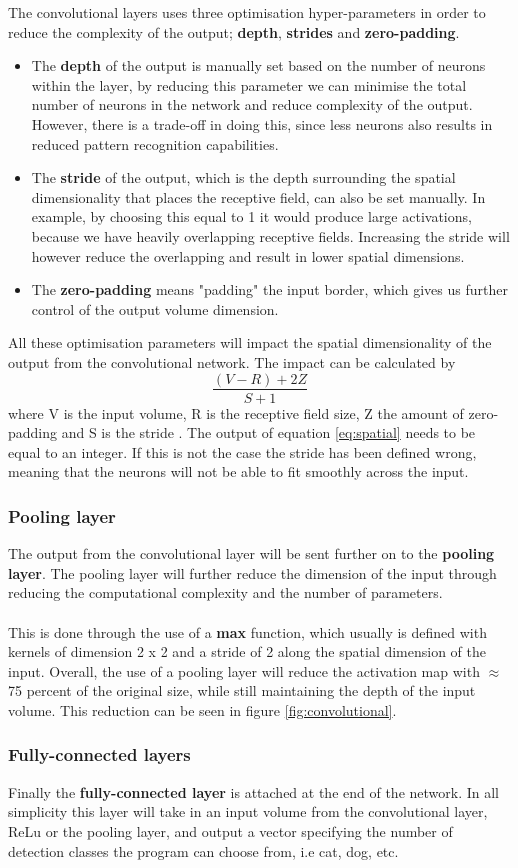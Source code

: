 The convolutional layers uses three optimisation hyper-parameters in order to reduce the complexity of the output; \textbf{depth}, \textbf{strides} and \textbf{zero-padding}.
\begin{itemize}
    \item The \textbf{depth} of the output is manually set based on the number of neurons within the layer, by reducing this parameter we can minimise the total number of neurons in the network and reduce complexity of the output. However, there is a trade-off in doing this, since less neurons also results in reduced pattern recognition capabilities.
    \item The \textbf{stride} of the output, which is the depth surrounding the spatial dimensionality that places the receptive field, can also be set manually. In example, by choosing this equal to 1 it would produce large activations, because we have heavily overlapping receptive fields. Increasing the stride will however reduce the overlapping and result in lower spatial dimensions.
    \item The \textbf{zero-padding} means "padding" the input border, which gives us further control of the output volume dimension.
\end{itemize}
All these optimisation parameters will impact the spatial dimensionality of the output from the convolutional network. The impact can be calculated by
\begin{equation}
    \frac{(V-R)+2Z}{S+1}
\label{eq:spatial}
\end{equation}
where V is the input volume, R is the receptive field size, Z the amount of zero-padding and S is the stride \cite{Keiron}. The output of equation \ref{eq:spatial} needs to be equal to an integer. If this is not the case the stride has been defined wrong, meaning that the neurons will not be able to fit smoothly across the input. 
\subsubsection{Pooling layer}
The output from the convolutional layer will be sent further on to the \textbf{pooling layer}. The pooling layer will further reduce the dimension of the input through reducing the computational complexity and the number of parameters.\\\\
This is done through the use of a \textbf{max} function, which usually is defined with kernels of dimension 2 x 2 and a stride of 2 along the spatial dimension of the input. Overall, the use of a pooling layer will reduce the activation map with $\approx$ 75 percent of the original size, while still maintaining the depth of the input volume. This reduction can be seen in figure \ref{fig:convolutional}. 
\subsubsection{Fully-connected layers}
Finally the \textbf{fully-connected layer} is attached at the end of the network. In all simplicity this layer will take in an input volume from the convolutional layer, ReLu or the pooling layer, and output a vector specifying the number of detection classes the program can choose from, i.e cat, dog, etc. 


